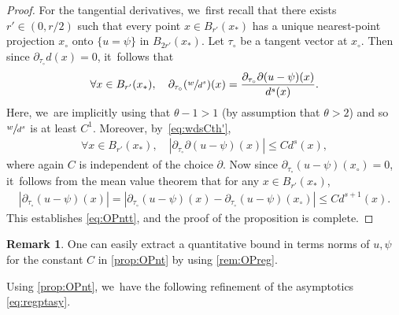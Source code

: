 \documentclass[JEP,XML,SOM,Unicode,published]{cedram}
\theoremstyle{plain}
\theoremstyle{definition}
\newtheorem{remark}[thm]{Remark}
\let\p\partial
\begin{document}
\begin{proof}
For the tangential derivatives, we~first recall that there exists $r'\in (0,r/2)$ such that every point $x\in B_{r'}(x_*)$ has a unique nearest-point projection $x_\circ$ onto $\{u=\psi\}$ in $B_{2r'}(x_*)$. Let $\tau_\circ$ be a tangent vector at $x_\circ$. Then since $\p_{\tau_\circ}d (x) = 0$, it~follows that
\begin{align*}
\forall x\in B_{r'}(x_*), \quad \p_{\tau_\circ}(\sfrac{w}{d^s})(x) = \frac{\p_{\tau_\circ}\p(u-\psi)(x)}{d^s(x)}.
\end{align*}
Here, we~are implicitly using that $\theta-1>1$ (by assumption that $\theta>2$) and so $\sfrac{w}{d^s}$ is at least $C^1$. Moreover, by~\eqref{eq:wdsCth'},
\begin{align*}
\forall x\in B_{r'}(x_*), \quad |{\p_{\tau_\circ}\p(u-\psi)(x)}|\le C d^s(x),
\end{align*}
where again $C$ is independent of the choice $\p$. Now since $\p_{\tau_\circ}(u-\psi)(x_\circ)=0$, it~follows from the mean value theorem that for any $x\in B_{r'}(x_*)$,
\begin{align*}
|\p_{\tau_\circ}(u-\psi)(x)| = |\p_{\tau_\circ}(u-\psi)(x) - \p_{\tau_\circ}(u-\psi)(x_\circ)| \le Cd^{s+1}(x).
\end{align*}
This establishes \eqref{eq:OPntt}, and the proof of the proposition is complete.
\end{proof}

\begin{remark}
One can easily extract a quantitative bound in terms norms of $u,\psi$ for the constant $C$ in \cref{prop:OPnt} by using \cref{rem:OPreg}.
\end{remark}

Using \cref{prop:OPnt}, we~have the following refinement of the asymptotics \eqref{eq:regptasy}.
\end{document}
